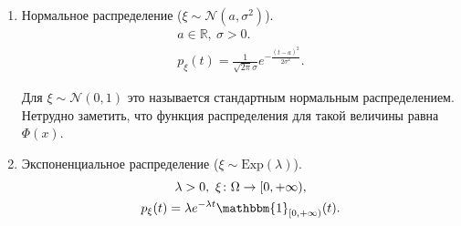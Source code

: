 \begin{examples}
\begin{enumerate}
         \item Нормальное распределение ($\xi\sim \mathcal{N}(a, \sigma^2)$).
         \begin{gather*}
             a\in\mathbb{R}, \ \sigma > 0.\\
             p_\xi (t) = \frac{1}{\sqrt{2\pi}\sigma} e^{-\frac{(t-a)^2}{2\sigma^2}}.
         \end{gather*}

               Для $\xi\sim\mathcal{N}(0, 1)$ это называется стандартным нормальным распределением. Нетрудно заметить, что функция распределения для такой величины равна $\Phi(x)$.

         \item Экспоненциальное распределение ($\xi\sim \text{Exp}(\lambda)$).
         \begin{gather*}
             \lambda > 0, \ \xi \colon \Omega \rightarrow [0, +\infty), \\
             p_\xi (t) =\lambda e^{-\lambda t}\mathbbm{1}_{[0, +\infty)}(t).
         \end{gather*}
     \end{enumerate}
 \end{examples}

